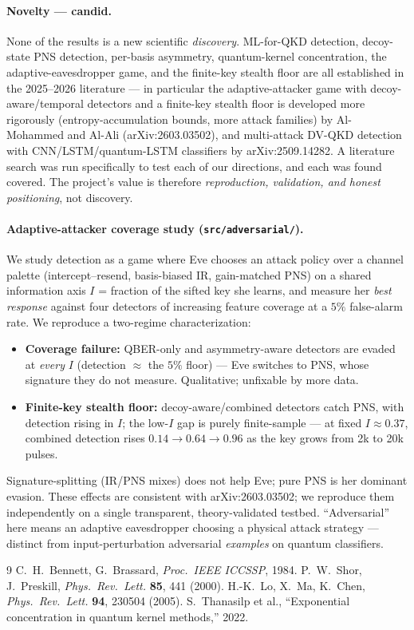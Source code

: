\documentclass[11pt]{article}
\begin{document}
\paragraph{Novelty --- candid.} None of the results is a new scientific
\emph{discovery}. ML-for-QKD detection, decoy-state PNS detection, per-basis
asymmetry, quantum-kernel concentration, the adaptive-eavesdropper game, and the
finite-key stealth floor are all established in the 2025--2026 literature --- in
particular the adaptive-attacker game with decoy-aware/temporal detectors and a
finite-key stealth floor is developed more rigorously (entropy-accumulation bounds,
more attack families) by Al-Mohammed and Al-Ali (arXiv:2603.03502), and multi-attack
DV-QKD detection with CNN/LSTM/quantum-LSTM classifiers by arXiv:2509.14282. A
literature search was run specifically to test each of our directions, and each was
found covered. The project's value is therefore \emph{reproduction, validation, and
honest positioning}, not discovery.

\paragraph{Adaptive-attacker coverage study (\texttt{src/adversarial/}).} We study
detection as a game where Eve chooses an attack policy over a channel palette
(intercept--resend, basis-biased IR, gain-matched PNS) on a shared information axis
$I$ = fraction of the sifted key she learns, and measure her \emph{best response}
against four detectors of increasing feature coverage at a $5\%$ false-alarm rate.
We reproduce a two-regime characterization:
\begin{itemize}
  \item \textbf{Coverage failure:} QBER-only and asymmetry-aware detectors are
  evaded at \emph{every} $I$ (detection $\approx$ the $5\%$ floor) --- Eve switches
  to PNS, whose signature they do not measure. Qualitative; unfixable by more data.
  \item \textbf{Finite-key stealth floor:} decoy-aware/combined detectors catch
  PNS, with detection rising in $I$; the low-$I$ gap is purely finite-sample ---
  at fixed $I\!\approx\!0.37$, combined detection rises $0.14\to0.64\to0.96$ as the
  key grows from 2k to 20k pulses.
\end{itemize}
Signature-splitting (IR/PNS mixes) does not help Eve; pure PNS is her dominant
evasion. These effects are consistent with arXiv:2603.03502; we reproduce them
independently on a single transparent, theory-validated testbed. ``Adversarial''
here means an adaptive eavesdropper choosing a physical attack strategy --- distinct
from input-perturbation adversarial \emph{examples} on quantum classifiers.

\begin{thebibliography}{9}
 C.~H.~Bennett, G.~Brassard, \emph{Proc.\ IEEE ICCSSP}, 1984.
 P.~W.~Shor, J.~Preskill, \emph{Phys.\ Rev.\ Lett.} \textbf{85}, 441 (2000).
 H.-K.~Lo, X.~Ma, K.~Chen, \emph{Phys.\ Rev.\ Lett.} \textbf{94}, 230504 (2005).
 S.~Thanasilp et al., ``Exponential concentration in quantum kernel methods,'' 2022.
\end{thebibliography}
\end{document}
